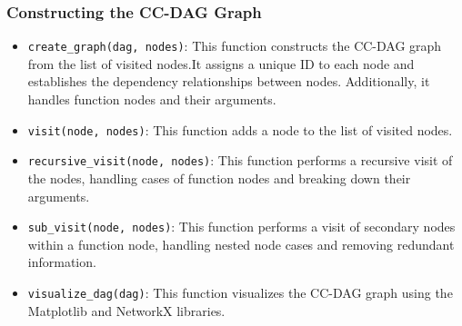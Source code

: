 \documentclass[11pt]{report}
\begin{document}
\subsubsection*{Constructing the CC-DAG Graph}
\begin{itemize}
    \item \texttt{create\_graph(dag, nodes)}: This function constructs the CC-DAG graph from the list of visited nodes.It assigns a unique ID to each node and establishes the dependency relationships between nodes. Additionally, it handles function nodes and their arguments.
    \item \texttt{visit(node, nodes)}: This function adds a node to the list of visited nodes.
    \item \texttt{recursive\_visit(node, nodes)}: This function performs a recursive visit of the nodes, handling cases of function nodes and breaking down their arguments.
    \item \texttt{sub\_visit(node, nodes)}: This function performs a visit of secondary nodes within a function node, handling nested node cases and removing redundant information.
    \item \texttt{visualize\_dag(dag)}: This function visualizes the CC-DAG graph using the Matplotlib and NetworkX libraries.
\end{itemize}
\end{document}
